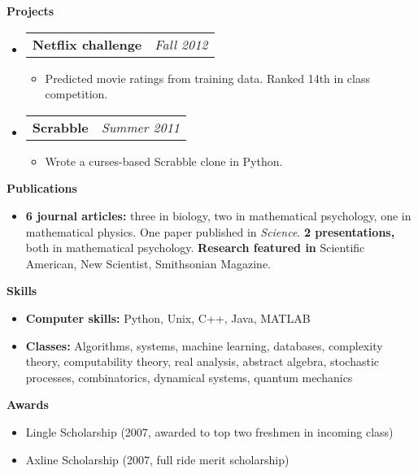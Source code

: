 \documentclass[letterpaper,11pt]{article}
\makeatletter
\newcommand{\resitem}[1]{\item #1 \vspace{-2pt}}
\newcommand{\resheading}[1]{{\large \colorbox{mygrey}{\begin{minipage}{\textwidth}{\textbf{#1 \vphantom{p\^{E}}}}\end{minipage}}}}
\newcommand{\ressubheading}[4]{
\begin{tabular*}{7.0in}{l@{\extracolsep{\fill}}r}
		\textbf{#1} & \textit{#4} \\
\end{tabular*}\vspace{-6pt}}
\makeatother
\begin{document}
\resheading{Projects}
\begin{itemize}
\item
	\ressubheading{Netflix challenge}{Pasadena, CA}{Student}{Fall 2012}
	\begin{itemize}
		\resitem{Predicted movie ratings from training data.  Ranked 14th in class competition.}
	\end{itemize}
\item
	\ressubheading{Scrabble}{Pasadena, CA}{Self-employed}{Summer 2011}
	\begin{itemize}
		\resitem{Wrote a curses-based Scrabble clone in Python.}
	\end{itemize}
\end{itemize}

\resheading{Publications}
\begin{itemize}
	\item {\bf 6 journal articles:} three in biology, two in mathematical psychology, one in mathematical physics.  One paper published in \emph{Science}.  {\bf 2 presentations,} both in mathematical psychology.  {\bf Research featured in} Scientific American, New Scientist, Smithsonian Magazine.
\end{itemize}

\resheading{Skills}
\begin{itemize}
\item \textbf{Computer skills:} Python, Unix, C++, Java, MATLAB
\item \textbf{Classes:} Algorithms, systems, machine learning, databases, complexity theory, computability theory, real analysis, abstract algebra, stochastic processes, combinatorics, dynamical systems, quantum mechanics
\end{itemize}

\resheading{Awards}
\begin{itemize}
	\item Lingle Scholarship (2007, awarded to top two freshmen in incoming class)
	\item Axline Scholarship (2007, full ride merit scholarship)
\end{itemize}
\end{document}
